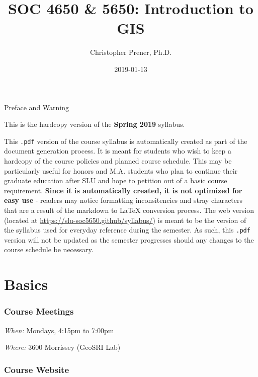 \documentclass[]{book}
\title{SOC 4650 \& 5650: Introduction to GIS}
\author{Christopher Prener, Ph.D.}
\date{2019-01-13}
\begin{document}
\maketitle

\begin{center}
{\huge Preface and Warning} \\
\end{center}
\vspace{5mm}
This is the hardcopy version of the \textbf{Spring 2019} syllabus.
\vspace{5mm}
\par \noindent This \texttt{.pdf} version of the course syllabus is automatically created as part of the document generation process. It is meant for students who wish to keep a hardcopy of the course policies and planned course schedule. This may be particularly useful for honors and M.A. students who plan to continue their graduate education after SLU and hope to petition out of a basic course requirement. \textbf{Since it is automatically created, it is not optimized for easy use} - readers may notice formatting inconsitencies and stray characters that are a result of the markdown to \LaTeX{} conversion process. The web version (located at \href{https://slu-soc5650.github/syllabus/}{https://slu-soc5650.github/syllabus/}) is meant to be the version of the syllabus used for everyday reference during the semester. As such, this \texttt{.pdf} version will not be updated as the semester progresses should any changes to the course schedule be necessary.

\hypertarget{basics}{%
\chapter*{Basics}\label{basics}}

\hypertarget{course-meetings}{%
\subsection*{Course Meetings}\label{course-meetings}}

\emph{When:} Mondays, 4:15pm to 7:00pm

\emph{Where:} 3600 Morrissey (GeoSRI Lab)

\hypertarget{course-website}{%
\subsection*{Course Website}\label{course-website}}
\end{document}
